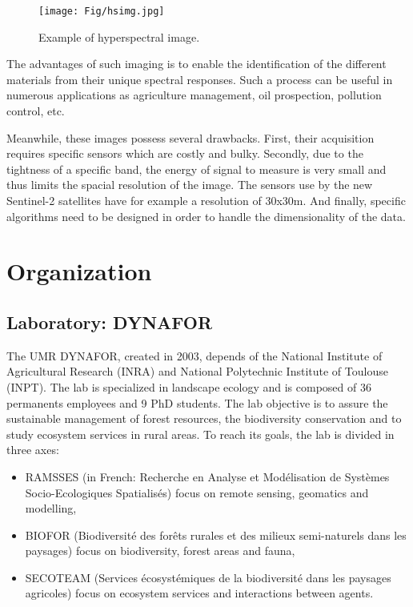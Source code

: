 \documentclass[a4paper,11pt,DIV=16,abstracton]{scrartcl}
\begin{document}
\begin{figure}[!ht]
    \centering
    \texttt{[image: Fig/hsimg.jpg]}
    \caption{Example of hyperspectral image.\label{fig:hs-img}}
\end{figure}

The advantages of such imaging is to enable the identification of the different materials from their unique spectral responses. Such a process can be useful in numerous applications as agriculture management, oil prospection, pollution control, etc.

Meanwhile, these images possess several drawbacks. First, their acquisition requires specific sensors which are costly and bulky. Secondly, due to the tightness of a specific band, the energy of signal to measure is very small and thus limits the spacial resolution of the image. The sensors use by the new Sentinel-2 satellites have for example a resolution of 30x30m. And finally, specific algorithms need to be designed in order to handle the dimensionality of the data.

\section{Organization}
\label{sec:orga}

    \subsection{Laboratory: DYNAFOR}

    The UMR DYNAFOR, created in 2003, depends of the National Institute of Agricultural Research (INRA) and National Polytechnic Institute of Toulouse (INPT). The lab is specialized in landscape ecology and is composed of 36 permanents employees and 9 PhD students. The lab objective is to assure the sustainable management of forest resources, the biodiversity conservation and to study ecosystem services in rural areas. To reach its goals, the lab is divided in three axes:
    \begin{itemize}
        \item RAMSSES (in French: Recherche en Analyse et Modélisation de Systèmes Socio-Ecologiques Spatialisés) focus on remote sensing, geomatics and modelling,
        \item BIOFOR (Biodiversité des forêts rurales et des milieux semi-naturels dans les paysages) focus on biodiversity, forest areas and fauna,
        \item SECOTEAM (Services écosystémiques de la biodiversité dans les paysages agricoles) focus on ecosystem services and interactions between agents.
    \end{itemize}
\end{document}
